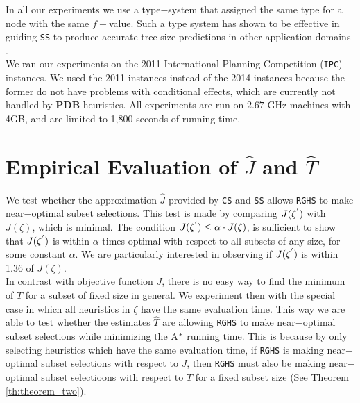 In all our experiments we use a type$-$system that assigned the same type for a node with the same $f-$value. Such a type system has shown to be effective in guiding \texttt{SS} to produce accurate tree size predictions in other application domains \cite{lelis2013predicting,lelis2014memory}.\\

We ran our experiments on the 2011 International Planning Competition (\texttt{IPC}) instances. We used the 2011 instances instead of the 2014 instances because the former do not have problems with conditional effects, which are currently not handled by \textbf{PDB} heuristics. All experiments are run on $2.67$ GHz machines with 4GB, and are limited to 1,800 seconds of running time.\\

\section{Empirical Evaluation of $\hat{J}$ and $\hat{T}$}
\noindent
We test whether the approximation $\hat{J}$ provided by \texttt{CS} and \texttt{SS} allows \texttt{RGHS} to make near$-$optimal subset selections. This test is made by comparing $J(\zeta\sp{'})$ with $J(\zeta)$, which is minimal. The condition $J(\zeta\sp{'}) \leq \alpha \cdot J(\zeta)$, is sufficient to show that $J(\zeta\sp{'})$ is within $\alpha$ times optimal with respect to all subsets of any size, for some constant $\alpha$. We are particularly interested in observing if $J(\zeta\sp{'})$ is within 1.36 of $J(\zeta)$.\\

In contrast with objective function $J$, there is no easy way to find the minimum of $T$ for a subset of fixed size in general. We experiment then with the special case in which all heuristics in $\zeta$ have the same evaluation time. This way we are able to test whether the estimates $\hat{T}$ are allowing \texttt{RGHS} to make near$-$optimal subset selections while minimizing the A$\sp{*}$ running time. This is because by only selecting heuristics which have the same evaluation time, if \texttt{RGHS} is making near$-$optimal subset selections with respect to $J$, then \texttt{RGHS} must also be making near$-$optimal subset selectioons with respect to $T$ for a fixed subset size (See Theorem \ref{th:theorem_two}).\\

